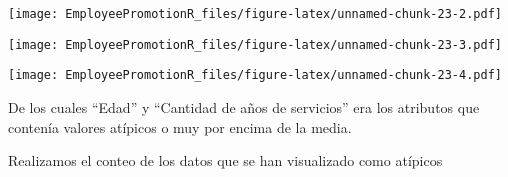 \documentclass[
]{article}
\newenvironment{Shaded}{\begin{snugshade}}{\end{snugshade}}
\newcommand{\AttributeTok}[1]{\textcolor[rgb]{0.77,0.63,0.00}{#1}}
\newcommand{\DecValTok}[1]{\textcolor[rgb]{0.00,0.00,0.81}{#1}}
\newcommand{\FunctionTok}[1]{\textcolor[rgb]{0.00,0.00,0.00}{#1}}
\newcommand{\NormalTok}[1]{#1}
\newcommand{\OtherTok}[1]{\textcolor[rgb]{0.56,0.35,0.01}{#1}}
\newcommand{\SpecialCharTok}[1]{\textcolor[rgb]{0.00,0.00,0.00}{#1}}
\newcommand{\StringTok}[1]{\textcolor[rgb]{0.31,0.60,0.02}{#1}}
\begin{document}
\texttt{[image: EmployeePromotionR\_files/figure-latex/unnamed-chunk-23-2.pdf]}

\begin{Shaded}
\end{Shaded}

\texttt{[image: EmployeePromotionR\_files/figure-latex/unnamed-chunk-23-3.pdf]}

\begin{Shaded}
\end{Shaded}

\texttt{[image: EmployeePromotionR\_files/figure-latex/unnamed-chunk-23-4.pdf]}

De los cuales ``Edad'' y ``Cantidad de años de servicios'' era los
atributos que contenía valores atípicos o muy por encima de la media.

Realizamos el conteo de los datos que se han visualizado como atípicos

\begin{Shaded}
\end{Shaded}
\end{document}
